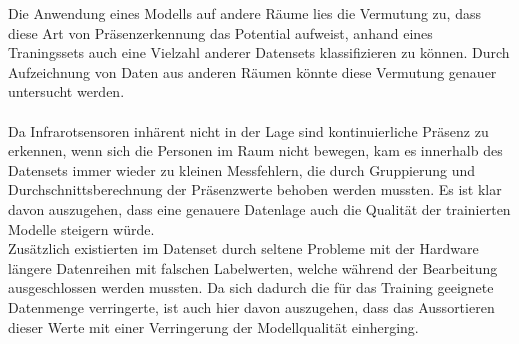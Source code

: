 \newpage

Die Anwendung eines Modells auf andere Räume lies die Vermutung zu, dass diese Art von Präsenzerkennung das 
Potential aufweist, anhand eines Traningssets auch eine Vielzahl anderer Datensets klassifizieren zu können.
Durch Aufzeichnung von Daten aus anderen Räumen könnte diese Vermutung genauer untersucht werden.  \\\\

Da Infrarotsensoren inhärent nicht in der Lage sind kontinuierliche Präsenz zu erkennen, wenn sich die Personen
im Raum nicht bewegen, kam es innerhalb des Datensets immer wieder zu kleinen Messfehlern, die durch Gruppierung
und Durchschnittsberechnung der Präsenzwerte behoben werden mussten. Es ist klar davon auszugehen, dass eine 
genauere Datenlage auch die Qualität der trainierten Modelle steigern würde.\\
Zusätzlich existierten im Datenset durch seltene Probleme mit der Hardware längere Datenreihen mit falschen 
Labelwerten, welche während der Bearbeitung ausgeschlossen werden mussten. Da sich dadurch die für das Training 
geeignete Datenmenge verringerte, ist auch hier davon auszugehen, dass das Aussortieren dieser Werte
mit einer Verringerung der Modellqualität einherging. 
